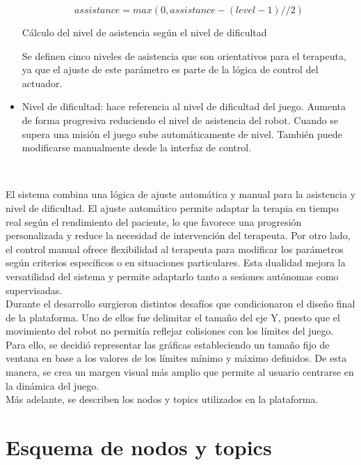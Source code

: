 \begin{itemize}
	\begin{myequation}[h]
		\begin{equation}
		assistance = max(0, assistance - (level - 1) // 2)
		\nonumber
		\label{ec:ec3}
		\end{equation}
		\caption[Cálculo del nivel de asistencia según el nivel de dificultad]{Cálculo del nivel de asistencia según el nivel de dificultad}
	\end{myequation}
	Se definen cinco niveles de asistencia que son orientativos para el terapeuta, ya que el ajuste de este parámetro es parte de la lógica de control del actuador.
	\item Nivel de dificultad: hace referencia al nivel de dificultad del juego. Aumenta de forma progresiva reduciendo el nivel de asistencia del robot. Cuando se supera una misión el juego sube automáticamente de nivel. También puede modificarse manualmente desde la interfaz de control.
\end{itemize}\

El sistema combina una lógica de ajuste automática y manual para la asistencia y nivel de dificultad.
El ajuste automático permite adaptar la terapia en tiempo real según el rendimiento del paciente, lo que favorece una progresión personalizada y reduce la necesidad de intervención del terapeuta.
Por otro lado, el control manual ofrece flexibilidad al terapeuta para modificar los parámetros según criterios específicos o en situaciones particulares.
Esta dualidad mejora la versatilidad del sistema y permite adaptarlo tanto a sesiones autónomas como supervisadas.\\

Durante el desarrollo surgieron distintos desafíos que condicionaron el diseño final de la plataforma.
Uno de ellos fue delimitar el tamaño del eje Y, puesto que el movimiento del robot no permitía reflejar colisiones con los límites del juego.
Para ello, se decidió representar las gráficas estableciendo un tamaño fijo de ventana en base a los valores de los límites mínimo y máximo definidos.
De esta manera, se crea un margen visual más amplio que permite al usuario centrarse en la dinámica del juego.\\

Más adelante, se describen los nodos y topics utilizados en la plataforma.

\section{Esquema de nodos y topics}
\label{section:review}

